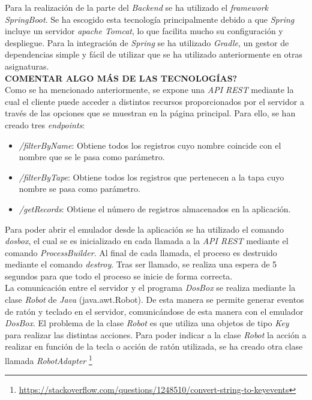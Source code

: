 \documentclass[10pt,a4paper]{article}
\begin{document}
Para la realización de la parte del \textit{Backend} se ha utilizado el \textit{framework SpringBoot}. Se ha escogido esta tecnología principalmente debido a que \textit{Spring} incluye un servidor \textit{apache Tomcat}, lo que facilita mucho su configuración y despliegue. Para la integración de \textit{Spring} se ha utilizado \textit{Gradle}, un gestor de dependencias simple y fácil de utilizar que se ha utilizado anteriormente en otras asignaturas.\\
\textbf{COMENTAR ALGO MÁS DE LAS TECNOLOGÍAS?}\\

Como se ha mencionado anteriormente, se expone una \textit{API REST} mediante la cual el cliente puede acceder a distintos recursos proporcionados por el servidor a través de las opciones que se muestran en la página principal. Para ello, se han creado tres \textit{endpoints}:
\begin{itemize}
	\item \textit{/filterByName}: Obtiene todos los registros cuyo nombre coincide con el nombre que se le pasa como parámetro.
	\item \textit{/filterByTape}: Obtiene todos los registros que pertenecen a la tapa cuyo nombre se pasa como parámetro.
	\item \textit{/getRecords}: Obtiene el número de registros almacenados en la aplicación.
\end{itemize}
Para poder abrir el emulador desde la aplicación se ha utilizado el comando \textit{dosbox}, el cual se es inicializado en cada llamada a la \textit{API REST} mediante el comando \textit{ProcessBuilder}.  Al final de cada llamada, el proceso es destruido mediante el comando \textit{destroy}. Tras ser llamado, se realiza una espera de 5 segundos para que todo el proceso se inicie de forma correcta.\\

La comunicación entre el servidor y el programa \textit{DosBox} se realiza mediante la clase \textit{Robot} de \textit{Java} (java.awt.Robot). De esta manera se permite generar eventos de ratón y teclado en el servidor, comunicándose de esta manera con el emulador \textit{DosBox}. El problema de la clase \textit{Robot} es que utiliza una objetos de tipo \textit{Key} para realizar las distintas acciones. Para poder indicar a la clase \textit{Robot} la acción a realizar en función de la tecla o acción de ratón utilizada, se ha creado otra clase llamada \textit{RobotAdapter} \footnote{\url{https://stackoverflow.com/questions/1248510/convert-string-to-keyevents}}\\
\end{document}
